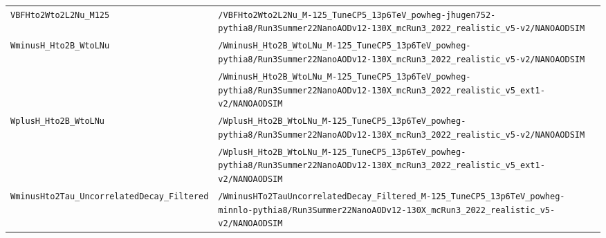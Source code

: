 \begin{longtable}{@{}>{\RaggedRight\arraybackslash}p{} >{\RaggedRight\arraybackslash}p{}@{}}
\addlinespace[2pt]
\texttt{VBFHto2Wto2L2Nu\_\allowbreak{}M125} & \texttt{/\allowbreak{}VBFHto2Wto2L2Nu\_\allowbreak{}M-\allowbreak{}125\_\allowbreak{}TuneCP5\_\allowbreak{}13p6TeV\_\allowbreak{}powheg-\allowbreak{}jhugen752-\allowbreak{}pythia8/\allowbreak{}Run3Summer22NanoAODv12-\allowbreak{}130X\_\allowbreak{}mcRun3\_\allowbreak{}2022\_\allowbreak{}realistic\_\allowbreak{}v5-\allowbreak{}v2/\allowbreak{}NANOAODSIM} \\
\addlinespace[2pt]
\texttt{WminusH\_\allowbreak{}Hto2B\_\allowbreak{}WtoLNu} & \texttt{/\allowbreak{}WminusH\_\allowbreak{}Hto2B\_\allowbreak{}WtoLNu\_\allowbreak{}M-\allowbreak{}125\_\allowbreak{}TuneCP5\_\allowbreak{}13p6TeV\_\allowbreak{}powheg-\allowbreak{}pythia8/\allowbreak{}Run3Summer22NanoAODv12-\allowbreak{}130X\_\allowbreak{}mcRun3\_\allowbreak{}2022\_\allowbreak{}realistic\_\allowbreak{}v5-\allowbreak{}v2/\allowbreak{}NANOAODSIM} \\
 & \texttt{/\allowbreak{}WminusH\_\allowbreak{}Hto2B\_\allowbreak{}WtoLNu\_\allowbreak{}M-\allowbreak{}125\_\allowbreak{}TuneCP5\_\allowbreak{}13p6TeV\_\allowbreak{}powheg-\allowbreak{}pythia8/\allowbreak{}Run3Summer22NanoAODv12-\allowbreak{}130X\_\allowbreak{}mcRun3\_\allowbreak{}2022\_\allowbreak{}realistic\_\allowbreak{}v5\_\allowbreak{}ext1-\allowbreak{}v2/\allowbreak{}NANOAODSIM} \\
\addlinespace[2pt]
\texttt{WplusH\_\allowbreak{}Hto2B\_\allowbreak{}WtoLNu} & \texttt{/\allowbreak{}WplusH\_\allowbreak{}Hto2B\_\allowbreak{}WtoLNu\_\allowbreak{}M-\allowbreak{}125\_\allowbreak{}TuneCP5\_\allowbreak{}13p6TeV\_\allowbreak{}powheg-\allowbreak{}pythia8/\allowbreak{}Run3Summer22NanoAODv12-\allowbreak{}130X\_\allowbreak{}mcRun3\_\allowbreak{}2022\_\allowbreak{}realistic\_\allowbreak{}v5-\allowbreak{}v2/\allowbreak{}NANOAODSIM} \\
 & \texttt{/\allowbreak{}WplusH\_\allowbreak{}Hto2B\_\allowbreak{}WtoLNu\_\allowbreak{}M-\allowbreak{}125\_\allowbreak{}TuneCP5\_\allowbreak{}13p6TeV\_\allowbreak{}powheg-\allowbreak{}pythia8/\allowbreak{}Run3Summer22NanoAODv12-\allowbreak{}130X\_\allowbreak{}mcRun3\_\allowbreak{}2022\_\allowbreak{}realistic\_\allowbreak{}v5\_\allowbreak{}ext1-\allowbreak{}v2/\allowbreak{}NANOAODSIM} \\
\addlinespace[2pt]
\texttt{WminusHto2Tau\_\allowbreak{}UncorrelatedDecay\_\allowbreak{}Filtered} & \texttt{/\allowbreak{}WminusHTo2TauUncorrelatedDecay\_\allowbreak{}Filtered\_\allowbreak{}M-\allowbreak{}125\_\allowbreak{}TuneCP5\_\allowbreak{}13p6TeV\_\allowbreak{}powheg-\allowbreak{}minnlo-\allowbreak{}pythia8/\allowbreak{}Run3Summer22NanoAODv12-\allowbreak{}130X\_\allowbreak{}mcRun3\_\allowbreak{}2022\_\allowbreak{}realistic\_\allowbreak{}v5-\allowbreak{}v2/\allowbreak{}NANOAODSIM} \\

\end{longtable}
